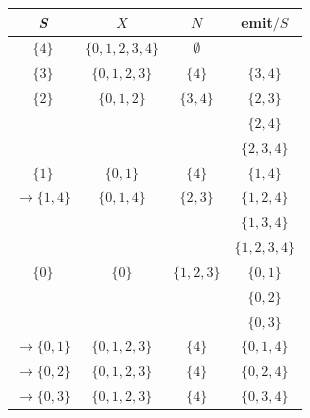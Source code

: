 \documentclass[12pt]{article}
\begin{document}
\begin{flushleft}
\begin{center}
\end{center}

\begin{center}
    \renewcommand{\arraystretch}{1.3} %
    \begin{tabular}{|c|c|c|c|}
        \hline
        \textbf{\textit{S}} & $X$ & $N$ & emit$/S$ \\ 
        \hline
        $\{4\}$ & $\{0,1,2,3,4\}$ & $\emptyset$ & \\ 
        \hline
        $\{3\}$ & $\{0,1,2,3\}$ & $\{4\}$ & $\{3,4\}$ \\ 
        \hline
        $\{2\}$ & $\{0,1,2\}$ & $\{3,4\}$ & $\{2,3\}$ \\ 
        &  &  & $\{2,4\}$ \\ 
        &  &  & $\{2,3,4\}$ \\ 
        \hline
        $\{1\}$ & $\{0,1\}$ & $\{4\}$ & $\{1,4\}$ \\ 
        \hline
        $\rightarrow \{1,4\}$ & $\{0,1,4\}$ & $\{2,3\}$ & $\{1,2,4\}$ \\ 
        &  &  & $\{1,3,4\}$ \\ 
        &  &  & $\{1,2,3,4\}$ \\ 
        \hline
        $\{0\}$ & $\{0\}$ & $\{1,2,3\}$ & $\{0,1\}$ \\ 
        &  &  & $\{0,2\}$ \\ 
        &  &  & $\{0,3\}$ \\ 
        \hline
        $\rightarrow \{0,1\}$ & $\{0,1,2,3\}$ & $\{4\}$ & $\{0,1,4\}$ \\ 
        \hline
        $\rightarrow \{0,2\}$ & $\{0,1,2,3\}$ & $\{4\}$ & $\{0,2,4\}$ \\ 
        \hline
        $\rightarrow \{0,3\}$ & $\{0,1,2,3\}$ & $\{4\}$ & $\{0,3,4\}$ \\ 
        \hline
    \end{tabular}
\end{center}



\end{flushleft}
\end{document}
